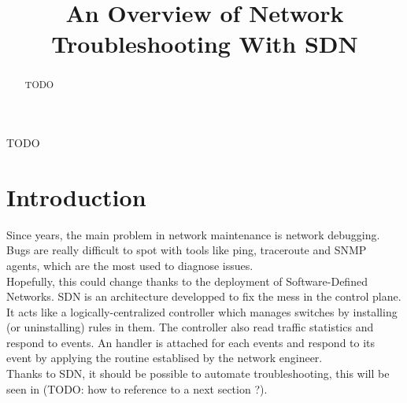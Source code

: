 \documentclass[10pt,article]{IEEEtran}
\begin{document}
\title{An Overview of Network Troubleshooting With SDN}


\maketitle
\begin{abstract}
TODO
\end{abstract}

\begin{IEEEkeywords}
TODO
\end{IEEEkeywords}

\section{Introduction}

Since years, the main problem in network maintenance is network debugging. Bugs are really difficult to spot with tools like ping, traceroute and SNMP agents, which are the most used to diagnose issues. \cite{...}\\ %
Hopefully, this could change thanks to the deployment of Software-Defined Networks. SDN is an architecture developped to fix the mess in the control plane. It acts like a logically-centralized controller which manages switches by installing (or uninstalling) rules in them. The controller also read traffic statistics and respond to events. An handler is attached for each events and respond to its event by applying the routine establised by the network engineer. \\
Thanks to SDN, it should be possible to automate troubleshooting, this will be seen in (TODO: how to reference to a next section ?).
\end{document}
